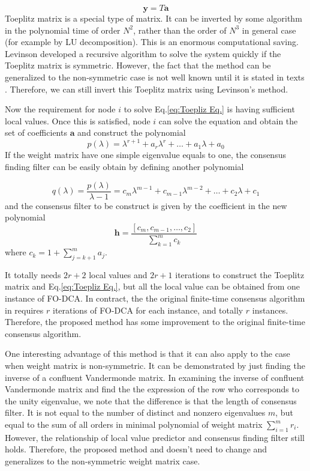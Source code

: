 \begin{equation}
\mathbf{y}=T\mathbf{a}\label{eq:Toepliz Eq.}
\end{equation}
 Toeplitz matrix is a special type of matrix. It can be inverted by
some algorithm in the polynomial time of order $N^{2}$, rather than
the order of $N^{3}$ in general case (for example by LU decomposition).
This is an enormous computational saving. Levinson developed a recursive
algorithm to solve the system quickly if the Toeplitz matrix is symmetric.
However, the fact that the method can be generalized to the non-symmetric
case is not well known until it is stated in texts \cite{Robinson2000}.
Therefore, we can still invert this Toeplitz matrix using Levinson's
method. 

Now the requirement for node $i$ to solve Eq.\ref{eq:Toepliz Eq.}
is having sufficient local values. Once this is satisfied, node $i$
can solve the equation and obtain the set of coefficients \textbf{$\mathbf{a}$}
and construct the polynomial 
\[
p(\lambda)=\lambda^{r+1}+a_{r}\lambda^{r}+\ldots+a_{1}\lambda+a_{0}
\]
If the weight matrix have one simple eigenvalue equals to one, the
consensus finding filter can be easily obtain by defining another
polynomial 

\[
q\left(\lambda\right)=\frac{p\left(\lambda\right)}{\lambda-1}=c_{m}\lambda^{m-1}+c_{m-1}\lambda^{m-2}+\ldots+c_{2}\lambda+c_{1}
\]
and the consensus filter to be construct is given by the coefficient
in the new polynomial 
\[
\mathbf{h}=\frac{\left[c_{m},c_{m-1},\ldots,c_{2}\right]}{\sum_{k=1}^{m}c_{k}}
\]
where $c_{k}=1+\sum_{j=k+1}^{m}a_{j}$. 

It totally needs $2r+2$ local values and $2r+1$ iterations to construct
the Toeplitz matrix and Eq.\ref{eq:Toepliz Eq.}, but all the local
value can be obtained from one instance of FO-DCA. In contract, the
the original finite-time consensus algorithm in \cite{Sundaram2007}
requires $r$ iterations of FO-DCA for each instance, and totally
$r$ instances. Therefore, the proposed method has some improvement
to the original finite-time consensus algorithm. 

One interesting advantage of this method is that it can also apply
to the case when weight matrix is non-symmetric. It can be demonstrated
by just finding the inverse of a confluent Vandermonde matrix. In
examining the inverse of confluent Vandermonde matrix and find the
the expression of the row who corresponds to the unity eigenvalue,
we note that the difference is that the length of consensus filter.
It is not equal to the number of distinct and nonzero eigenvalues
$m$, but equal to the sum of all orders in minimal polynomial of
weight matrix $\sum_{i=1}^{m}r_{i}$. However, the relationship of
local value predictor and consensus finding filter still holds. Therefore,
the proposed method and doesn't need to change and generalizes to
the non-symmetric weight matrix case. 
